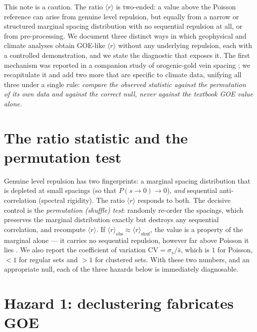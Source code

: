 \documentclass[11pt]{article}
\newcommand{\rr}{\langle r\rangle}
\begin{document}
This note is a caution. The ratio $\rr$ is two-ended: a value above the Poisson
reference can arise from genuine level repulsion, but equally from a narrow or
structured marginal spacing distribution with no sequential repulsion at all, or
from pre-processing. We document three distinct ways in which geophysical and
climate analyses obtain GOE-like $\rr$ without any underlying repulsion, each
with a controlled demonstration, and we state the diagnostic that exposes it. The
first mechanism was reported in a companion study of orogenic-gold vein spacing
\citep{chen2026sigma}; we recapitulate it and add two more that are specific to
climate data, unifying all three under a single rule: \emph{compare the observed
statistic against the permutation of its own data and against the correct null,
never against the textbook GOE value alone.}

\section{The ratio statistic and the permutation test}

Genuine level repulsion has two fingerprints: a marginal spacing distribution
that is depleted at small spacings (so that $P(s\!\to\!0)\to0$), \emph{and}
sequential anti-correlation (spectral rigidity). The ratio $\rr$ responds to
both. The decisive control is the \emph{permutation (shuffle) test}: randomly
re-order the spacings, which preserves the marginal distribution exactly but
destroys any sequential correlation, and recompute $\rr$. If
$\rr_{\mathrm{obs}}\approx\rr_{\mathrm{shuf}}$, the value is a property of the
marginal alone --- it carries no sequential repulsion, however far above Poisson
it lies \citep{chen2026nucleosome}. We also report the coefficient of variation
$\mathrm{CV}=\sigma_s/\bar s$, which is $1$ for Poisson, $<1$ for regular sets and
$>1$ for clustered sets. With these two numbers, and an appropriate null, each of
the three hazards below is immediately diagnosable.

\section{Hazard 1: declustering fabricates GOE}
\end{document}
